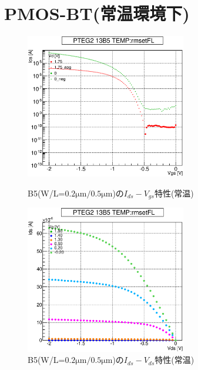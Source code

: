 		\section{PMOS-BT(常温環境下)}
				\begin{figure}[htbp]
					\begin{minipage}{0.5\hsize}
						\begin{center}
							\includegraphics[width=70mm]{./Chapter/Appendix/Picture/PBT/B5/PTEG2_13_B5_IdVg_rmsetFL.eps}
						\end{center}
						\caption{B5(W/L=$0.2\mathrm{\mu m}/0.5\mathrm{\mu m}$)の$I_{ds}-V_{gs}$特性(常温)}
						\label{fig:B5_IdVg_room}
					\end{minipage}
					\begin{minipage}{0.5\hsize}
						\begin{center}
							\includegraphics[width=70mm]{./Chapter/Appendix/Picture/PBT/B5/PTEG2_13_B5_IdVd_rmsetFL.eps}
						\end{center}
						\caption{B5(W/L=$0.2\mathrm{\mu m}/0.5\mathrm{\mu m}$)の$I_{ds}-V_{ds}$特性(常温)}
						\label{fig:B5_IdVd_room}
					\end{minipage}
				\end{figure}

